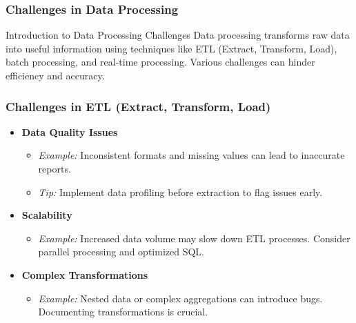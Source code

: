 \documentclass[aspectratio=169]{beamer}
\begin{document}
\begin{frame}[fragile]
  \frametitle{Challenges in Data Processing}
  \begin{block}{Introduction to Data Processing Challenges}
    Data processing transforms raw data into useful information using techniques like ETL (Extract, Transform, Load), batch processing, and real-time processing. Various challenges can hinder efficiency and accuracy. 
  \end{block}
\end{frame}

\begin{frame}[fragile]
  \frametitle{Challenges in ETL (Extract, Transform, Load)}
  \begin{itemize}
    \item \textbf{Data Quality Issues}
      \begin{itemize}
        \item \textit{Example:} Inconsistent formats and missing values can lead to inaccurate reports.
        \item \textit{Tip:} Implement data profiling before extraction to flag issues early.
      \end{itemize}
    \item \textbf{Scalability}
      \begin{itemize}
        \item \textit{Example:} Increased data volume may slow down ETL processes. Consider parallel processing and optimized SQL.
      \end{itemize}
    \item \textbf{Complex Transformations}
      \begin{itemize}
        \item \textit{Example:} Nested data or complex aggregations can introduce bugs. Documenting transformations is crucial.
      \end{itemize}
  \end{itemize}
\end{frame}
\end{document}
